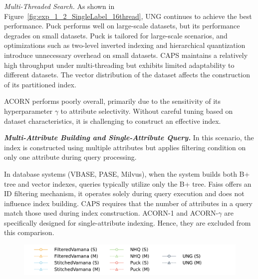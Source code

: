 \documentclass[sigconf, nonacm]{acmart}
\begin{document}
\begin{sloppypar}
\textit{Multi-Threaded Search.}
As shown in Figure~\ref{fig:exp_1_2_SingleLabel_16thread}, UNG continues to achieve the best performance. Puck performs well on large-scale datasets, but its performance degrades on small datasets. Puck is tailored for large-scale scenarios, and optimizations such as two-level inverted indexing and hierarchical quantization introduce unnecessary overhead on small datasets. 
CAPS maintains a relatively high throughput under multi-threading but exhibits limited adaptability to different datasets. The vector distribution of the dataset affects the construction of its partitioned index.

ACORN performs poorly overall, primarily due to the sensitivity of its hyperparameter $\gamma$ to attribute selectivity. Without careful tuning based on dataset characteristics, it is challenging to construct an effective index.

\textit{\textbf{Multi-Attribute Building and Single-Attribute Query.}}
In this scenario, the index is constructed using multiple attributes but applies filtering condition on only one attribute during query processing.

In database systems (VBASE, PASE, Milvus), when the system builds both B+ tree and vector indexes, queries typically utilize only the B+ tree. Faiss offers an ID filtering mechanism, it operates solely during query execution and does not influence index building. CAPS requires that the number of attributes in a query match those used during index construction. ACORN-1 and ACORN-\(\gamma\) are specifically designed for single-attribute indexing. Hence, they are excluded from this comparison.

\begin{figure}[th]
    \centering
    \setlength{\abovecaptionskip}{0cm}
    \setlength{\belowcaptionskip}{-0.1cm}
    \hspace*{15pt} %
    \includegraphics[width=0.98\columnwidth]{figures/exp/exp_2_legend.pdf} %
    \vspace{-10pt} %
    

\end{figure}
\end{sloppypar}
\end{document}
